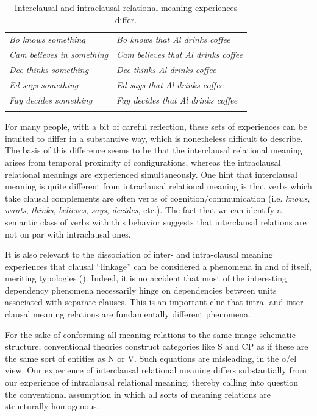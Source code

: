 \begin{table}
\begin{tabularx}{\textwidth}{XX}
\lsptoprule
\textit{Bo knows something} & \textit{Bo knows that Al drinks coffee}\\
\textit{Cam believes in something} & \textit{Cam believes that Al drinks coffee}\\
\textit{Dee thinks something}  & \textit{Dee thinks Al drinks coffee}\\
\textit{Ed says something} & \textit{Ed says that Al drinks coffee}\\
\textit{Fay decides something} & \textit{Fay decides that Al drinks coffee}\\
\lspbottomrule
\end{tabularx}
\caption{Interclausal and intraclausal relational meaning experiences differ.}\label{tab:5:1}
\end{table}
  For many people, with a bit of careful reflection, these sets of experiences can be intuited to differ in a substantive way, which is nonetheless difficult to describe. The basis of this difference seems to be that the interclausal relational meaning arises from temporal proximity of configurations, whereas the intraclausal relational meanings are experienced simultaneously. One hint that interclausal meaning is quite different from intraclausal relational meaning is that verbs which take clausal complements are often verbs of cognition/communication (i.e. \textit{knows}, \textit{wants}, \textit{thinks}, \textit{believes}, \textit{says}, \textit{decides}, etc.). The fact that we can identify a semantic class of verbs with this behavior suggests that interclausal relations are not on par with intraclausal ones. 

  It is also relevant to the dissociation of inter- and intra-clausal meaning experiences that clausal “linkage” can be considered a phenomena in and of itself, meriting typologies (\citealt{Bickel2010,Bril2010,Lehmann1988,VanValinJr1984}). Indeed, it is no accident that most of the interesting dependency phenomena necessarily hinge on dependencies between units associated with separate clauses. This is an important clue that intra- and inter-clausal meaning relations are fundamentally different phenomena.

  For the sake of conforming all meaning relations to the same image schematic structure, conventional theories construct categories like S and CP as if these are the same sort of entities as N or V. Such equations are misleading, in the o/el view. Our experience of interclausal relational meaning differs substantially from our experience of intraclausal relational meaning, thereby calling into question the conventional assumption in which all sorts of meaning relations are structurally homogenous.

